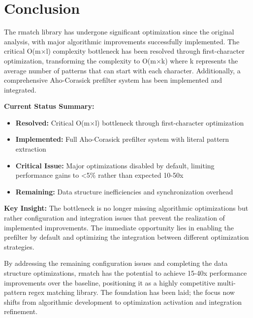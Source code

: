 \documentclass[11pt,a4paper]{article}
\begin{document}
\section{Conclusion}

The rmatch library has undergone significant optimization since the original analysis, with major algorithmic improvements successfully implemented. The critical O(m$\times$l) complexity bottleneck has been resolved through first-character optimization, transforming the complexity to O(m$\times$k) where k represents the average number of patterns that can start with each character. Additionally, a comprehensive Aho-Corasick prefilter system has been implemented and integrated.

\textbf{Current Status Summary:}
\begin{itemize}
\item \textbf{Resolved:} Critical O(m$\times$l) bottleneck through first-character optimization
\item \textbf{Implemented:} Full Aho-Corasick prefilter system with literal pattern extraction
\item \textbf{Critical Issue:} Major optimizations disabled by default, limiting performance gains to <5\% rather than expected 10-50x
\item \textbf{Remaining:} Data structure inefficiencies and synchronization overhead
\end{itemize}

\textbf{Key Insight:} The bottleneck is no longer missing algorithmic optimizations but rather configuration and integration issues that prevent the realization of implemented improvements. The immediate opportunity lies in enabling the prefilter by default and optimizing the integration between different optimization strategies.

By addressing the remaining configuration issues and completing the data structure optimizations, rmatch has the potential to achieve 15-40x performance improvements over the baseline, positioning it as a highly competitive multi-pattern regex matching library. The foundation has been laid; the focus now shifts from algorithmic development to optimization activation and integration refinement.



\end{document}
